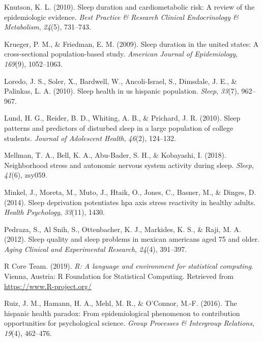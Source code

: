 \documentclass[man, fleqn, noextraspace]{apa6}
\begin{document}
\leavevmode\hypertarget{ref-knutson2010sleep}{}%
Knutson, K. L. (2010). Sleep duration and cardiometabolic risk: A review of the epidemiologic evidence. \emph{Best Practice \& Research Clinical Endocrinology \& Metabolism}, \emph{24}(5), 731--743.

\leavevmode\hypertarget{ref-krueger2009sleep}{}%
Krueger, P. M., \& Friedman, E. M. (2009). Sleep duration in the united states: A cross-sectional population-based study. \emph{American Journal of Epidemiology}, \emph{169}(9), 1052--1063.

\leavevmode\hypertarget{ref-loredo2010sleep}{}%
Loredo, J. S., Soler, X., Bardwell, W., Ancoli-Israel, S., Dimsdale, J. E., \& Palinkas, L. A. (2010). Sleep health in us hispanic population. \emph{Sleep}, \emph{33}(7), 962--967.

\leavevmode\hypertarget{ref-lund2010sleep}{}%
Lund, H. G., Reider, B. D., Whiting, A. B., \& Prichard, J. R. (2010). Sleep patterns and predictors of disturbed sleep in a large population of college students. \emph{Journal of Adolescent Health}, \emph{46}(2), 124--132.

\leavevmode\hypertarget{ref-mellman_2018_SNS}{}%
Mellman, T. A., Bell, K. A., Abu-Bader, S. H., \& Kobayashi, I. (2018). Neighborhood stress and autonomic nervous system activity during sleep. \emph{Sleep}, \emph{41}(6), zsy059.

\leavevmode\hypertarget{ref-minkel2014sleep}{}%
Minkel, J., Moreta, M., Muto, J., Htaik, O., Jones, C., Basner, M., \& Dinges, D. (2014). Sleep deprivation potentiates hpa axis stress reactivity in healthy adults. \emph{Health Psychology}, \emph{33}(11), 1430.

\leavevmode\hypertarget{ref-pedraza2012sleep}{}%
Pedraza, S., Al Snih, S., Ottenbacher, K. J., Markides, K. S., \& Raji, M. A. (2012). Sleep quality and sleep problems in mexican americans aged 75 and older. \emph{Aging Clinical and Experimental Research}, \emph{24}(4), 391--397.

\leavevmode\hypertarget{ref-R-base}{}%
R Core Team. (2019). \emph{R: A language and environment for statistical computing}. Vienna, Austria: R Foundation for Statistical Computing. Retrieved from \url{https://www.R-project.org/}

\leavevmode\hypertarget{ref-ruiz2016hispanic}{}%
Ruiz, J. M., Hamann, H. A., Mehl, M. R., \& O'Connor, M.-F. (2016). The hispanic health paradox: From epidemiological phenomenon to contribution opportunities for psychological science. \emph{Group Processes \& Intergroup Relations}, \emph{19}(4), 462--476.
\end{document}
